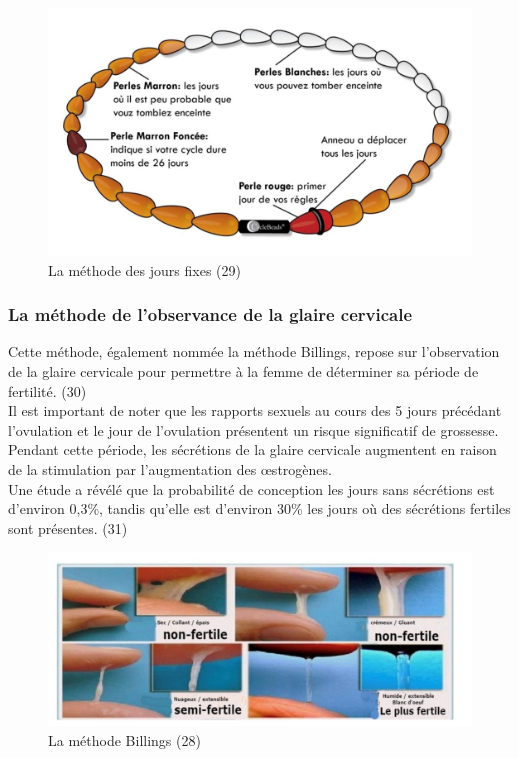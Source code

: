 \begin{figure}[H]
  \centering
  \includegraphics[scale=.3]{Images/fig_13}
  \caption{La méthode des jours fixes (29)}
\end{figure}

\subsubsection{La méthode de l’observance de la glaire cervicale}
Cette méthode, également nommée la méthode Billings, repose sur l’observation de la glaire cervicale pour permettre à la femme de déterminer sa période de fertilité. (30) \\

\noindent Il est important de noter que les rapports sexuels au cours des 5 jours précédant l'ovulation et le jour de l'ovulation présentent un risque significatif de grossesse. Pendant cette période, les sécrétions de la glaire cervicale augmentent en raison de la stimulation par l'augmentation des œstrogènes.\\

\noindent Une étude a révélé que la probabilité de conception les jours sans sécrétions est d'environ 0,3\%, tandis qu'elle est d'environ 30\% les jours où des sécrétions fertiles sont présentes. (31) 

\begin{figure}[H]
  \centering
  \includegraphics[scale=.3]{Images/fig_14.jpg}
  \caption{La méthode Billings (28)}
\end{figure}

